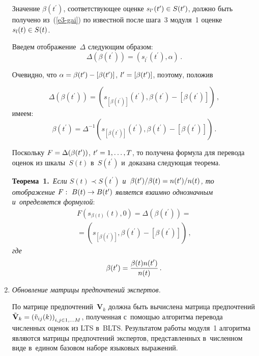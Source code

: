 \begin{multicols}{2}
\begin{enumerate}[1.]
  Значение $\beta(t^\prime)$, соответствующее оценке 
$s_{l^\prime}(t^\prime)\hm\in S(t^\prime)$, должно быть получено  
из~(\ref{e3-gai}) по известной после шага~3 модуля~1 оценке $s_l(t)\hm\in S(t)$. 
  
  Введем отображение~$\Delta$ следующим образом:
  \begin{equation*}
  \Delta\left( \beta(t^\prime)\right)=\left( 
s_{l^\prime}\left(t^\prime\right),\alpha\right)\,.
  \end{equation*}
  
  Очевидно, что $\alpha\hm= \beta(t^\prime)\hm- [ \beta(t^\prime)]$, 
$l^\prime\hm=[\beta(t^\prime)]$, поэтому, положив

\noindent
  \begin{equation*}
  \Delta\left( \beta (t^\prime)\right) =\left( s_{[\beta(t^\prime)]}(t^\prime), 
\beta(t^\prime)-\left[ \beta(t^\prime)\right]\right)\,,
  \end{equation*}
имеем:
\begin{equation*}
\beta(t^\prime)= \Delta^{-1} \left( s_{[\beta(t^\prime)]}(t^\prime), \beta(t^\prime)-
\left[ \beta(t^\prime)\right]\right)\,.
\end{equation*}
  
  Поскольку $F\hm= \Delta(\beta(t^\prime))$, $t^\prime\hm= 1,\ldots , T$, то 
получена формула для перевода оценок из шкалы~$S(t)$ в~$S(t^\prime)$ 
и~доказана следующая теорема.
  
  \smallskip
  
  \noindent
  \textbf{Теорема~1.}\ \textit{Если $S(t)\prec S(t^\prime)$ 
и~$\beta(t^\prime)/\beta(t)\hm= n(t^\prime)/n(t)$, то отображение $F:\ B(t)\hm\to 
B(t^\prime)$ является взаимно однозначным и~определяется формулой}:
  \begin{multline*}
  F\left( s_{\beta(t)}(t),0\right)=\Delta 
  \left( \beta(t^\prime)\right) ={}\\
  {}=\left( 
s_{[\beta(t^\prime)]}, \beta(t^\prime)-\left[ \beta(t^\prime)\right]\right)\,,
  \end{multline*}
\textit{где}
\begin{equation*}
\beta(t^\prime) =\displaystyle\frac{\displaystyle \beta(t) n(t^\prime)\mathstrut}{\displaystyle n(t)\mathstrut}\,.
\end{equation*}
\item \textit{Обновление матрицы предпочтений экспертов. }

  По матрице предпочтений~$\mathbf{V}_k$ должна быть вычислена матрица 
предпочтений $\tilde{\mathbf{V}}_k\hm= \left( \tilde{v}_{ij}(k)\right)_{i,j\in 
1,\ldots M}$, полученная с~помощью алгоритма перевода численных оценок из 
LTS в~BLTS. Результатом работы модуля~1 алгоритма являются матрицы 
предпочтений экспертов, представленных в~численном виде в~едином базовом 
наборе языковых выражений.
  \end{enumerate}
  

\end{multicols}
